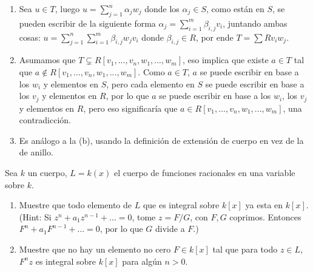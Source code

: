 \begin{sol}{1.45}
    \begin{enumerate}
        \item Sea \(u\in T\), luego \(u=\sum_{j=1}^n\alpha_jw_j\) donde los \(\alpha_j\in S\), como están en \(S\), se pueden escribir de la siguiente forma \(\alpha_j=\sum_{i=1}^m\beta_{i,j}v_i\), juntando ambas cosas: \(u=\sum_{j=1}^n\sum_{i=1}^m\beta_{i,j}w_jv_i\) donde \(\beta_{i,j}\in R\), por ende \(T=\sum Rv_iw_j\).
        \item Asumamos que \(T\subsetneq R[v_1,...,v_n,w_1,...,w_m]\), eso implica que existe \(a\in T\) tal que \(a\notin R[v_1,...,v_n,w_1,...,w_m]\). Como \(a\in T\), \(a\) se puede escribir en base a los \(w_i\) y elementos en \(S\), pero cada elemento en \(S\) se puede escribir en base a los \(v_j\) y elementos en \(R\), por lo que \(a\) se puede escribir en base a los \(w_i\), los \(v_j\) y elementos en \(R\), pero eso significaría que \(a\in R[v_1,...,v_n,w_1,...,w_m]\), una contradicción.
        \item Es análogo a la (b), usando la definición de extensión de cuerpo en vez de la de anillo.
    \end{enumerate}
\end{sol}

\begin{prob}{1.49}
    Sea \(k\) un cuerpo, \(L=k(x)\) el cuerpo de funciones racionales en una variable sobre \(k\).
    \begin{enumerate}
        \item Muestre que todo elemento de \(L\) que es integral sobre \(k[x]\) ya esta en \(k[x]\). (Hint: Si \(z^n+a_1z^{n-1}+...=0\), tome \(z=F/G\), con \(F,G\) coprimos. Entonces \(F^n+a_1F^{n-1}+...=0\), por lo que \(G\) divide a \(F\).)
        \item Muestre que no hay un elemento no cero \(F\in k[x]\) tal que para todo \(z\in L\), \(F^nz\) es integral sobre \(k[x]\) para algún \(n>0\).
    \end{enumerate}
\end{prob}

